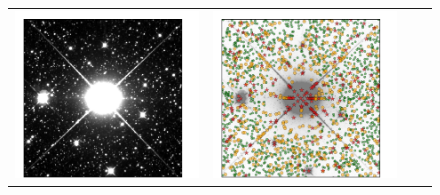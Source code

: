 \documentclass[12pt,preprint]{aastex}
\begin{document}
\begin{figure}
\begin{center}
\begin{tabular}{@{}c@{\spc}c@{\spc}c@{\spc}c@{}}
      \includegraphics[width=\figw]{bright-36} &
      \includegraphics[width=\figw]{bright-37} &

\end{tabular}
\end{center}
\end{figure}
\end{document}
